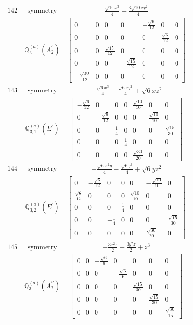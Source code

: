 \documentclass[fleqn,8pt,landscape]{jsarticle}
\begin{document}
\begin{longtable}{ccc}
$ 142 $ & $ \text{symmetry} $ & $ \frac{\sqrt{10} x^{3}}{4} - \frac{3 \sqrt{10} x y^{2}}{4} $ \\
$  $ & $ \mathbb{Q}_{3}^{(a)}(A_{2}^{\prime}) $ & $ \begin{bmatrix} 0 & 0 & 0 & 0 & - \frac{\sqrt{6}}{12} & 0 & 0 \\ 0 & 0 & 0 & 0 & 0 & \frac{\sqrt{6}}{12} & 0 \\ 0 & 0 & \frac{\sqrt{15}}{12} & 0 & 0 & 0 & 0 \\ 0 & 0 & 0 & - \frac{\sqrt{15}}{12} & 0 & 0 & 0 \\ - \frac{\sqrt{30}}{12} & 0 & 0 & 0 & 0 & 0 & 0 \end{bmatrix} $ \\ \hline
$ 143 $ & $ \text{symmetry} $ & $ - \frac{\sqrt{6} x^{3}}{4} - \frac{\sqrt{6} x y^{2}}{4} + \sqrt{6} x z^{2} $ \\
$  $ & $ \mathbb{Q}_{3,1}^{(a)}(E^{\prime}) $ & $ \begin{bmatrix} - \frac{\sqrt{6}}{12} & 0 & 0 & 0 & \frac{\sqrt{10}}{10} & 0 & 0 \\ 0 & - \frac{\sqrt{6}}{12} & 0 & 0 & 0 & \frac{\sqrt{10}}{10} & 0 \\ 0 & 0 & \frac{1}{4} & 0 & 0 & 0 & \frac{\sqrt{15}}{30} \\ 0 & 0 & 0 & \frac{1}{4} & 0 & 0 & 0 \\ 0 & 0 & 0 & 0 & \frac{\sqrt{30}}{20} & 0 & 0 \end{bmatrix} $ \\ \hline
$ 144 $ & $ \text{symmetry} $ & $ - \frac{\sqrt{6} x^{2} y}{4} - \frac{\sqrt{6} y^{3}}{4} + \sqrt{6} y z^{2} $ \\
$  $ & $ \mathbb{Q}_{3,2}^{(a)}(E^{\prime}) $ & $ \begin{bmatrix} 0 & - \frac{\sqrt{6}}{12} & 0 & 0 & 0 & - \frac{\sqrt{10}}{10} & 0 \\ \frac{\sqrt{6}}{12} & 0 & 0 & 0 & \frac{\sqrt{10}}{10} & 0 & 0 \\ 0 & 0 & 0 & \frac{1}{4} & 0 & 0 & 0 \\ 0 & 0 & - \frac{1}{4} & 0 & 0 & 0 & \frac{\sqrt{15}}{30} \\ 0 & 0 & 0 & 0 & 0 & \frac{\sqrt{30}}{20} & 0 \end{bmatrix} $ \\ \hline
$ 145 $ & $ \text{symmetry} $ & $ - \frac{3 x^{2} z}{2} - \frac{3 y^{2} z}{2} + z^{3} $ \\
$  $ & $ \mathbb{Q}_{3}^{(a)}(A_{2}^{\prime\prime}) $ & $ \begin{bmatrix} 0 & 0 & - \frac{\sqrt{6}}{6} & 0 & 0 & 0 & 0 \\ 0 & 0 & 0 & - \frac{\sqrt{6}}{6} & 0 & 0 & 0 \\ 0 & 0 & 0 & 0 & \frac{\sqrt{15}}{30} & 0 & 0 \\ 0 & 0 & 0 & 0 & 0 & \frac{\sqrt{15}}{30} & 0 \\ 0 & 0 & 0 & 0 & 0 & 0 & \frac{\sqrt{30}}{15} \end{bmatrix} $ \\ \hline

\end{longtable}
\end{document}

